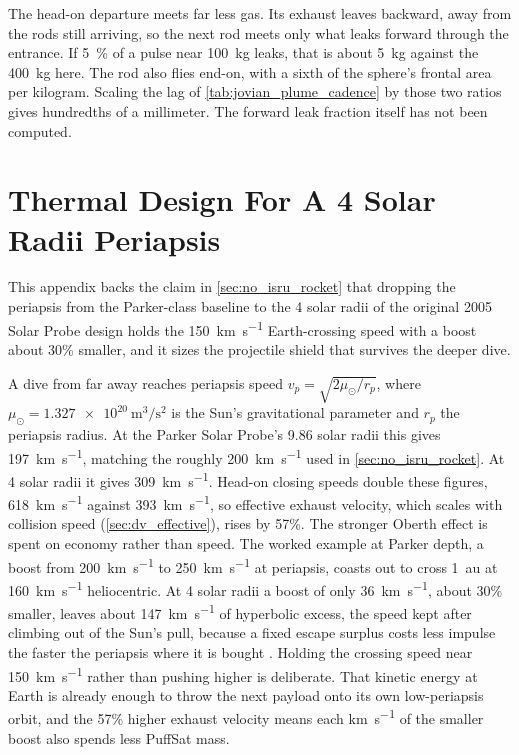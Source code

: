 \documentclass{article}
\begin{document}
The head-on departure meets far less gas. Its exhaust leaves backward, away from the rods still arriving, so the next rod meets only what leaks forward through the entrance. If \SI{5}{\percent} of a pulse near \SI{100}{\kilogram} leaks, that is about \SI{5}{\kilogram} against the \SI{400}{\kilogram} here. The rod also flies end-on, with a sixth of the sphere's frontal area per kilogram. Scaling the lag of \autoref{tab:jovian_plume_cadence} by those two ratios gives hundredths of a millimeter. The forward leak fraction itself has not been computed.

\section{Thermal Design For A 4 Solar Radii Periapsis}\label{sec:four_radii_thermal}
This appendix backs the claim in \autoref{sec:no_isru_rocket} that dropping the periapsis from the Parker-class baseline to the 4 solar radii of the original 2005 Solar Probe design \cite{mccomas2005solar} holds the \SI{150}{\kilo\meter\per\second} Earth-crossing speed with a boost about 30\% smaller, and it sizes the projectile shield that survives the deeper dive.

A dive from far away reaches periapsis speed $v_p = \sqrt{2\mu_\odot/r_p}$, where $\mu_\odot = \SI{1.327e20}{\meter\cubed\per\second\squared}$ is the Sun's gravitational parameter and $r_p$ the periapsis radius. At the Parker Solar Probe's 9.86 solar radii this gives \SI{197}{\kilo\meter\per\second}, matching the roughly \SI{200}{\kilo\meter\per\second} used in \autoref{sec:no_isru_rocket}. At 4 solar radii it gives \SI{309}{\kilo\meter\per\second}. Head-on closing speeds double these figures, \SI{618}{\kilo\meter\per\second} against \SI{393}{\kilo\meter\per\second}, so effective exhaust velocity, which scales with collision speed (\autoref{sec:dv_effective}), rises by 57\%. The stronger Oberth effect is spent on economy rather than speed. The worked example at Parker depth, a boost from \SI{200}{\kilo\meter\per\second} to \SI{250}{\kilo\meter\per\second} at periapsis, coasts out to cross \SI{1}{\astronomicalunit} at \SI{160}{\kilo\meter\per\second} heliocentric. At 4 solar radii a boost of only \SI{36}{\kilo\meter\per\second}, about 30\% smaller, leaves about \SI{147}{\kilo\meter\per\second} of hyperbolic excess, the speed kept after climbing out of the Sun's pull, because a fixed escape surplus costs less impulse the faster the periapsis where it is bought \cite{Katz_aim_is_all_you_need_2025}. Holding the crossing speed near \SI{150}{\kilo\meter\per\second} rather than pushing higher is deliberate. That kinetic energy at Earth is already enough to throw the next payload onto its own low-periapsis orbit, and the 57\% higher exhaust velocity means each \si{\kilo\meter\per\second} of the smaller boost also spends less PuffSat mass.
\end{document}
